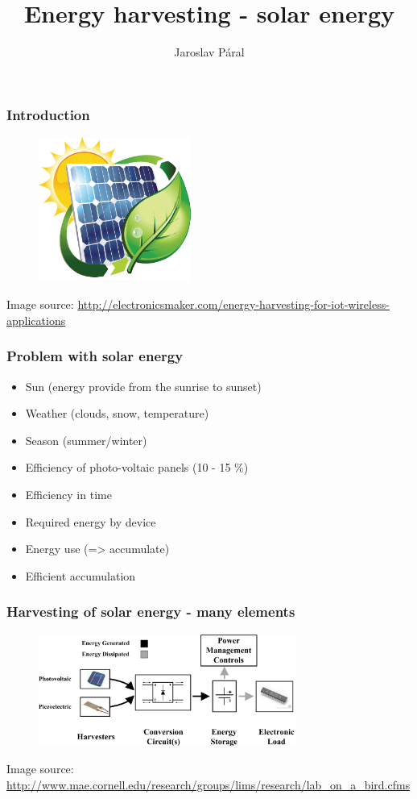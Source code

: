 \documentclass[12;pt,t]{beamer} %
\author{Jaroslav Páral}
\institute[paral.jarek@gmail.com]{FI MUNI: PB174\\[0.5cm]}
\title{Energy harvesting - solar energy}
\newcommand{\srctext}[1]{{\fontsize{7}{9}\selectfont\textcolor{sourcesclr}{#1}}}
\begin{document}
\frame{\titlepage}

\begin{frame}
    \frametitle{Introduction}
    	\begin{figure}[H]
            \includegraphics[width=190px]{img/Energy-harvesting.png}
    	\end{figure}
    	    \srctext{Image source: \url{http://electronicsmaker.com/energy-harvesting-for-iot-wireless-applications}}
\end{frame}

\begin{frame}
    \frametitle{Problem with solar energy}
		\begin{itemize}
			\item Sun (energy provide from the sunrise to sunset)
			\item Weather (clouds, snow, temperature)
			\item Season (summer/winter)
            \item Efficiency of photo-voltaic panels (10 - 15 \%)
            \item Efficiency in time  
     		\item Required energy by device
            \item Energy use (=> accumulate)
            \item Efficient accumulation
       \end{itemize}
\end{frame}

\begin{frame}
    \frametitle{Harvesting of solar energy - many elements}    	
        \begin{figure}[H]
            \includegraphics[width=320px]{img/energy_harvesting_block_diagram.png}
       	\end{figure}
    \srctext{Image source: \url{http://www.mae.cornell.edu/research/groups/lims/research/lab_on_a_bird.cfms}}
\end{frame}
\end{document}
